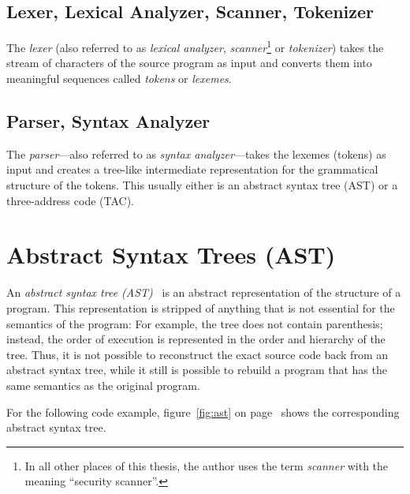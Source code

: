\subsection{Lexer, Lexical Analyzer, Scanner, Tokenizer}

The \emph{lexer} (also referred to as \emph{lexical analyzer}, \emph{scanner}\footnote{In all other places of this thesis, the author uses the term \emph{scanner} with the meaning ``security scanner''.} or \emph{tokenizer}) takes the stream of characters of the source program as input and converts them into meaningful sequences called \emph{tokens} or \emph{lexemes}.~\cite{compilers, compiler-construction}


\subsection{Parser, Syntax Analyzer}

The \emph{parser}---also referred to as \emph{syntax analyzer}---takes the lexemes (tokens) as input and creates a tree-like intermediate representation for the grammatical structure of the to\-kens. This usually either is an abstract syntax tree (AST) or a three-address code (TAC).~\cite{compilers, compiler-construction}


\section{Abstract Syntax Trees (AST)}
\label{ast}

An \emph{abstract syntax tree (AST)}~\cite{compiler-construction} is an abstract representation of the structure of a program. This representation is stripped of anything that is not essential for the semantics of the program: For example, the tree does not contain parenthesis; instead, the order of execution is represented in the order and hierarchy of the tree. Thus, it is not possible to reconstruct the exact source code back from an abstract syntax tree, while it still is possible to rebuild a program that has the same semantics as the original program.

For the following code example, figure~\ref{fig:ast} on page~\pageref{fig:ast} shows the corresponding abstract syntax tree.

